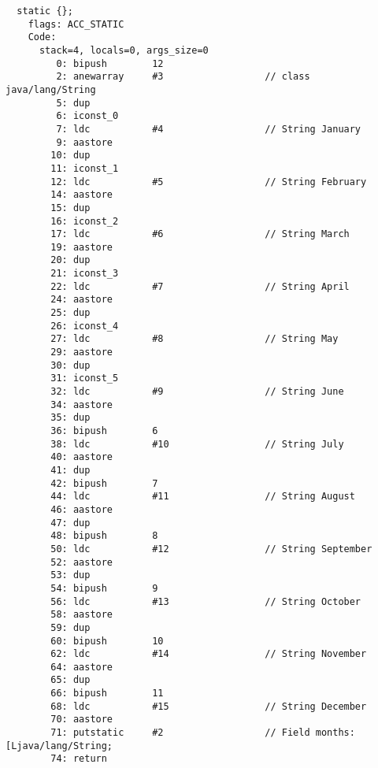 \begin{lstlisting}
  static {};
    flags: ACC_STATIC
    Code:
      stack=4, locals=0, args_size=0
         0: bipush        12
         2: anewarray     #3                  // class java/lang/String
         5: dup           
         6: iconst_0      
         7: ldc           #4                  // String January
         9: aastore       
        10: dup           
        11: iconst_1      
        12: ldc           #5                  // String February
        14: aastore       
        15: dup           
        16: iconst_2      
        17: ldc           #6                  // String March
        19: aastore       
        20: dup           
        21: iconst_3      
        22: ldc           #7                  // String April
        24: aastore       
        25: dup           
        26: iconst_4      
        27: ldc           #8                  // String May
        29: aastore       
        30: dup           
        31: iconst_5      
        32: ldc           #9                  // String June
        34: aastore       
        35: dup           
        36: bipush        6
        38: ldc           #10                 // String July
        40: aastore       
        41: dup           
        42: bipush        7
        44: ldc           #11                 // String August
        46: aastore       
        47: dup           
        48: bipush        8
        50: ldc           #12                 // String September
        52: aastore       
        53: dup           
        54: bipush        9
        56: ldc           #13                 // String October
        58: aastore       
        59: dup           
        60: bipush        10
        62: ldc           #14                 // String November
        64: aastore       
        65: dup           
        66: bipush        11
        68: ldc           #15                 // String December
        70: aastore       
        71: putstatic     #2                  // Field months:[Ljava/lang/String;
        74: return        
\end{lstlisting}

